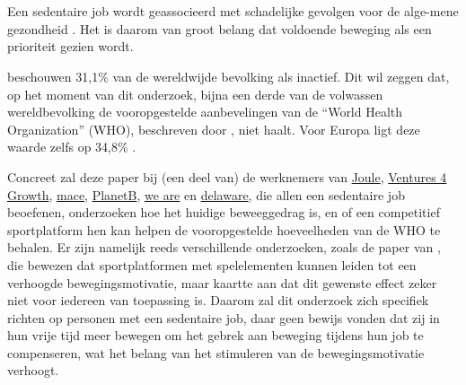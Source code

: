 
\chapter{}%
\label{ch:inleiding}


\section{}%
\label{sec:probleemstelling}

Een sedentaire job wordt geassocieerd met schadelijke gevolgen voor de alge-\linebreak mene gezondheid \autocite{Buckley2015}. Het is daarom van groot belang dat voldoende beweging als een prioriteit gezien wordt.

\textcite{Hallal2012} beschouwen 31,1\% van de wereldwijde bevolking als inactief. Dit wil zeggen dat, op het moment van dit onderzoek, bijna een derde van de volwassen wereldbevolking de vooropgestelde aanbevelingen van de ``World Health Organization'' (WHO), beschreven door \textcite{Bull2020}, niet haalt. Voor Europa ligt deze waarde zelfs op 34,8\% \autocite{Bull2020}.

Concreet zal deze paper bij (een deel van) de werknemers van \href{https://en.joule.be/}{Joule}, \href{https://www.ventures4growth.com/en}{Ventures 4 Growth}, \href{https://www.mace-legal.com/}{mace}, \href{https://planetb.life/en}{PlanetB}, \href{https://www.we-are.be/}{we are} en \href{https://www.delaware.pro/en-be}{delaware}, die allen een sedentaire job beoefenen, onderzoeken hoe het huidige beweeggedrag is, en of een competitief sportplatform hen kan helpen de vooropgestelde hoeveelheden van de WHO te behalen. Er zijn namelijk reeds verschillende onderzoeken, zoals de paper van \textcite{Kari2016}, die bewezen dat sportplatformen met spelelementen kunnen leiden tot een verhoogde bewegingsmotivatie, maar \textcite{Hamari2013a} kaartte aan dat dit gewenste effect zeker niet voor iedereen van toepassing is. Daarom zal dit onderzoek zich specifiek richten op personen met een sedentaire job, daar \textcite{Vandelanotte2015} geen bewijs vonden dat zij in hun vrije tijd meer bewegen om het gebrek aan beweging tijdens hun job te compenseren, wat het belang van het stimuleren van de bewegingsmotivatie verhoogt.

